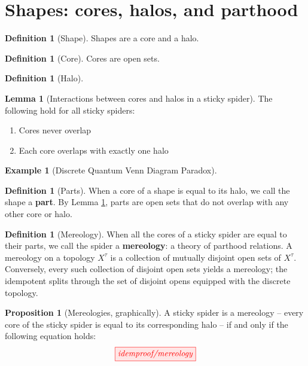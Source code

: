 \documentclass{tufte-handout}
\theoremstyle{definition}
\newtheorem{lemma}[theorem]{Lemma}
\newtheorem{proposition}[theorem]{Proposition}
\newtheorem{defn}[theorem]{Definition}
\newtheorem{example}[theorem]{Example}
\begin{document}
\section{Shapes: cores, halos, and parthood}

\begin{defn}[Shape]
Shapes are a core and a halo.
\end{defn}

\begin{defn}[Core]
Cores are open sets.
\end{defn}

\begin{defn}[Halo]
\end{defn}

\begin{lemma}[Interactions between cores and halos in a sticky spider]\label{lem:corehalo} The following hold for all sticky spiders:\\
\begin{enumerate}
\item{Cores never overlap}
\item{Each core overlaps with exactly one halo}
\end{enumerate}
\end{lemma}

\begin{example}[Discrete Quantum Venn Diagram Paradox]

\end{example}

\begin{defn}[Parts]
When a core of a shape is equal to its halo, we call the shape a \textbf{part}. By Lemma \ref{lem:corehalo}, parts are open sets that do not overlap with any other core or halo.
\end{defn}

\begin{defn}[Mereology]
 When all the cores of a sticky spider are equal to their parts, we call the spider a \textbf{mereology}: a theory of parthood relations. A mereology on a topology $X^\tau$ is a collection of mutually disjoint open sets of $X^\tau$. Conversely, every such collection of disjoint open sets yields a mereology; the idempotent splits through the set of disjoint opens equipped with the discrete topology.
\end{defn}

\begin{proposition}[Mereologies, graphically]
A sticky spider is a mereology -- every core of the sticky spider is equal to its corresponding halo -- if and only if the following equation holds:
\[\scalebox{1}{\tikzfig{idemproof/mereology}}\]
\end{proposition}
\end{document}
